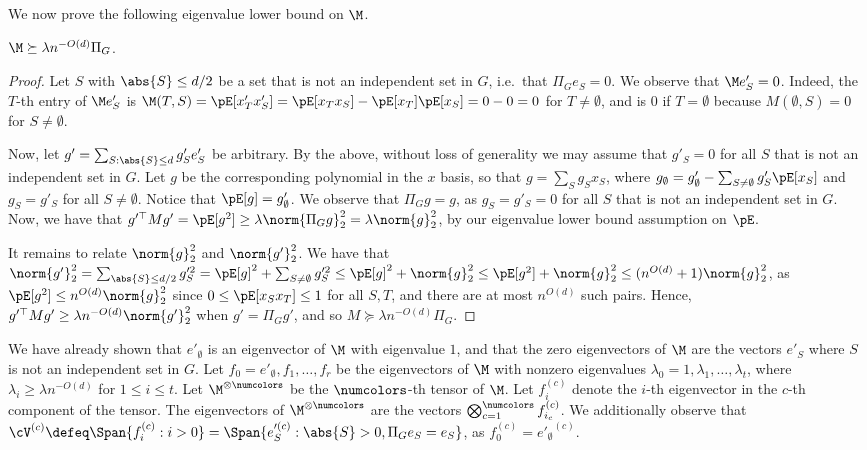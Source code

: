 We now prove the following eigenvalue lower bound on $\M$.
\begin{claim}
$\M \succeq \lambda n^{-O(d)} \Pi_G$.
\end{claim}
\begin{proof}
Let $S$ with $\abs{S} \leq d/2$ be a set that is not an independent set in $G$, i.e.\ that $\Pi_G e_S = 0$. We observe that $\M e'_S = 0$. Indeed, the $T$-th entry of $\M e'_S$ is $\M(T, S) = \pE[x'_T x'_S] = \pE[x_T x_S] - \pE[x_T] \pE[x_S] = 0 - 0 = 0$ for $T \ne \emptyset$, and is $0$ if $T = \emptyset$ because $M(\emptyset, S) = 0$ for $S \ne \emptyset$.

Now, let $g' = \sum_{S: \abs{S} \leq d} g'_S e'_{S}$ be arbitrary. By the above, without loss of generality we may assume that $g'_S = 0$ for all $S$ that is not an independent set in $G$. Let $g$ be the corresponding polynomial in the $x$ basis, so that $g = \sum_{S} g_S x_S$, where $g_\emptyset = g'_{\emptyset}  - \sum_{S \ne \emptyset} g'_S \pE[x_S]$ and $g_S = g'_S$ for all $S \ne \emptyset$. Notice that $\pE[g] = g'_{\emptyset}$. We observe that $\Pi_G g = g$, as $g_S = g'_S = 0$ for all $S$ that is not an independent set in $G$. Now, we have that $g'^{\top} M g' = \pE[g^2] \geq \lambda \norm{\Pi_G g}_2^2 = \lambda \norm{g}_2^2$, by our eigenvalue lower bound assumption on $\pE$.

It remains to relate $\norm{g}_2^2$ and $\norm{g'}_2^2$. We have that $\norm{g'}_2^2 = \sum_{\abs{S} \leq d/2} g'^2_S = \pE[g]^2 +  \sum_{S \ne \emptyset} g'^2_S \leq \pE[g]^2 + \norm{g}_2^2 \leq \pE[g^2] + \norm{g}_2^2 \leq (n^{O(d)} + 1) \norm{g}_2^2$, as $\pE[g^2] \leq n^{O(d)} \norm{g}_2^2$ since $0 \leq \pE[x_S x_T] \leq 1$ for all $S,T$, and there are at most $n^{O(d)}$ such pairs. Hence, $g'^{\top} M g' \geq \lambda n^{-O(d)} \norm{g'}_2^2$ when $g' = \Pi_G g'$, and so $M \succeq \lambda n^{-O(d)} \Pi_G$.
\end{proof}

We have already shown that $e'_{\emptyset}$ is an eigenvector of $\M$ with eigenvalue $1$, and that the zero eigenvectors of $\M$ are the vectors $e'_{S}$ where $S$ is not an independent set in $G$. Let $f_0 = e'_{\emptyset}, f_1, \dots, f_r$ be the eigenvectors of $\M$ with nonzero eigenvalues $\lambda_0 = 1, \lambda_1, \dots, \lambda_t$, where $\lambda_i \geq \lambda n^{-O(d)}$ for $1 \leq i \leq t$. Let $\M^{\otimes \numcolors}$ be the $\numcolors$-th tensor of $\M$. Let $f_{i}^{(c)}$ denote the $i$-th eigenvector in the $c$-th component of the tensor. The eigenvectors of $\M^{\otimes \numcolors}$ are the vectors $\bigotimes_{c = 1}^\numcolors f_{i_c}^{(c)}$. We additionally observe that $\cV^{(c)} \defeq \Span{f_i^{(c)} : i > 0} = \Span{e'^{(c)}_S : \abs{S} > 0, \Pi_G e_S = e_S}$, as $f_0^{(c)} = {e'_{\emptyset}}^{(c)}$. 

